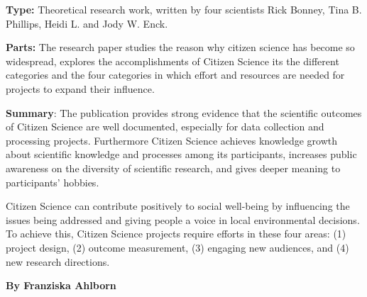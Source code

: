 \documentclass{article}
\begin{document}
\textbf{Type: }Theoretical research work, written by four scientists Rick Bonney, Tina B. Phillips, Heidi L. and Jody W. Enck.


\textbf{Parts: }The research paper studies the reason why citizen science has become so widespread, explores the accomplishments of Citizen Science its the different categories and the four categories in which effort and resources are needed for projects to expand their influence.


\textbf{Summary}: The publication provides strong evidence that the scientific outcomes of Citizen Science are well documented, especially for data collection and processing projects. Furthermore Citizen Science achieves knowledge growth about scientific knowledge and processes among its participants, increases public awareness on the diversity of scientific research, and gives deeper meaning to participants' hobbies.


Citizen Science can contribute positively to social well-being by influencing the issues being addressed and giving people a voice in local environmental decisions. To achieve this, Citizen Science projects require efforts in these four areas: (1) project design, (2) outcome measurement, (3) engaging new audiences, and (4) new research directions.


\textbf{By Franziska Ahlborn}


\printbibliography[title={Bibliography}]
\end{document}
